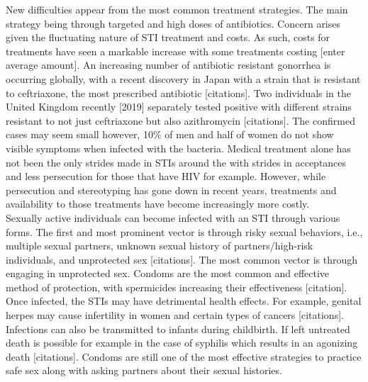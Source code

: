 \documentclass[
  donotrepeattitle,doc, 12pt, a4paper,floatsintext]{apa7}
\begin{document}
New difficulties appear from the most common treatment strategies. The main strategy being through targeted and high doses of antibiotics. Concern arises given the fluctuating nature of STI treatment and costs. As such, costs for treatments have seen a markable increase with some treatments costing {[}enter average amount{]}. An increasing number of antibiotic resistant gonorrhea is occurring globally, with a recent discovery in Japan with a strain that is resistant to ceftriaxone, the most prescribed antibiotic {[}citations{]}. Two individuals in the United Kingdom recently {[}2019{]} separately tested positive with different strains resistant to not just ceftriaxone but also azithromycin {[}citations{]}. The confirmed cases may seem small however, 10\% of men and half of women do not show visible symptoms when infected with the bacteria. Medical treatment alone has not been the only strides made in STIs around the with strides in acceptances and less persecution for those that have HIV for example. However, while persecution and stereotyping has gone down in recent years, treatments and availability to those treatments have become increasingly more costly.\\
Sexually active individuals can become infected with an STI through various forms. The first and most prominent vector is through risky sexual behaviors, i.e., multiple sexual partners, unknown sexual history of partners/high-risk individuals, and unprotected sex {[}citations{]}. The most common vector is through engaging in unprotected sex. Condoms are the most common and effective method of protection, with spermicides increasing their effectiveness {[}citation{]}. Once infected, the STIs may have detrimental health effects. For example, genital herpes may cause infertility in women and certain types of cancers {[}citations{]}. Infections can also be transmitted to infants during childbirth. If left untreated death is possible for example in the case of syphilis which results in an agonizing death {[}citations{]}. Condoms are still one of the most effective strategies to practice safe sex along with asking partners about their sexual histories.
\end{document}
